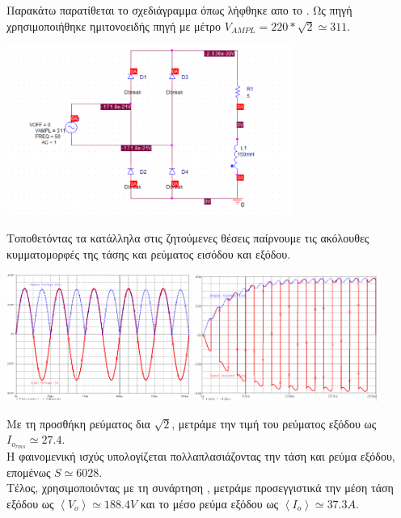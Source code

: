 \documentclass{assignment}
\begin{document}
\maketitle

Παρακάτω παρατίθεται το σχεδιάγραμμα όπως λήφθηκε απο το .
Ως πηγή χρησιμοποιήθηκε ημιτονοειδής πηγή με μέτρο $V_{AMPL} = 220 * \sqrt{2} \simeq 311$.

\includegraphics[width=0.7\textwidth]{exercise1-diag} 

Τοποθετόντας τα κατάλληλα  στις ζητούμενες θέσεις παίρνουμε 
τις ακόλουθες κυμματομορφές της τάσης και ρεύματος εισόδου και εξόδου.

\includegraphics[width=0.45\textwidth]{exercise1-1} 
\includegraphics[width=0.45\textwidth]{exercise1-2}


Με τη προσθήκη  ρεύματος δια $\sqrt{2}$, μετράμε την  τιμή του ρεύματος εξόδου ως $I_{o_{rms}} \simeq 27.4$.\\
Η φαινομενική ισχύς υπολογίζεται πολλαπλασιάζοντας την  τάση και ρεύμα εξόδου, επομένως $S \simeq 6028$.\\
Τέλος, χρησιμοποιόντας  με τη συνάρτηση , μετράμε προσεγγιστικά την μέση τάση εξόδου ως $\left<V_{o}\right> \simeq 188.4V$ και 
το μέσο ρεύμα εξόδου ως $\left<I_{o}\right> \simeq 37.3A$. 
\end{document}
